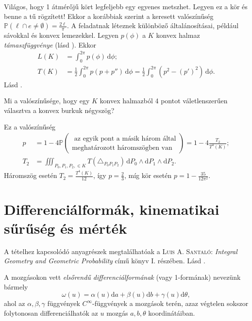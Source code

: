 \documentclass[DIV=15,appendixprefix]{scrreprt}
\theoremstyle{definition}
\theoremstyle{remark}
\newcommand{\prob}{\mathbb{P}}
\begin{document}
Világos, hogy 1 átmérőjű kört legfeljebb egy egyenes metszhet. Legyen ez a kör és benne a tű
rögzített! Ekkor a korábbiak szerint a keresett valószínűség $ \prob \left( \ell \cap e \neq
\emptyset\right) = \frac{ 2 \ell }{ \pi } $. A feladatnak léteznek különböző általánosításai,
például sávokkal és konvex lemezekkel.
%
Legyen $ p \left( \phi \right) $ a $ K $ konvex halmaz \emph{támaszfüggvénye} (lásd
\cite[1.~fejezet, 2.~szakasz, 3--4.~oldal]{Santalo}). Ekkor
\begin{align*}
	L \left( K \right) &= \int_{ 0 }^{ 2 \pi } p \left( \phi \right) \, \mathrm{ d } \phi;\\
	T \left( K \right) &= \frac{ 1 }{ 2 } \int_{ 0 }^{ 2 \pi } p \left( p + p'' \right) \,
	\mathrm{ d } \phi = \frac{ 1 }{ 2 } \int_{ 0 }^{ 2 \pi } \left( p^{ 2 } - \left( p'
		\right)^{ 2 } \right) \, \mathrm{ d } \phi.
\end{align*}
%
Lásd \cite[4.~fejezet, 5.~szakasz, 63--65.~oldal]{Santalo}.

Mi a valószínűsége, hogy egy $ K $ konvex halmazból 4 pontot váletlenszerűen választva a konvex
burkuk négyszög?

Ez a valószínűség
\begin{align*}
	p &= 1 - 4 \prob \left( \substack{\text{ az egyik pont a másik három által}\\\text{meghatározott
	háromszögben van}} \right) = 1 - 4 \frac{ T_{ 2 } }{ T^{ 4 } \left( K \right) };\\
	T_{ 2 } &= \iiint_{P_{ 0 },{} P_{ 1 },{} P_{ 2 },{} \in K } T \left( \triangle_{ P_{ 0 }
	P_{ 1 }P_{ 2 } } \right) \, \mathrm{ d } P_{ 0 } \wedge  \mathrm{ d } P_{ 1 } \wedge
	\mathrm{ d } P_{ 2 }.
\end{align*}
Háromszög esetén $ T_{ 2 } = \frac{ T^{ 4 } \left( K \right) }{ 12 } $, így $ p = \frac{ 2 }{ 3 } $,
míg kör esetén $ p = 1 - \frac{ 35 }{ 12 \pi^{ 2 } } $.
%
\section{Differenciálformák, kinematikai sűrűség és mérték}
%
A tételhez kapcsolódó anyagrészek megtalálhatóak a \textsc{Luis A. Santaló}: \emph{Integral Geometry
and Geometric Probability} \cite{Santalo} című könyv I. részében.
%
Lásd \cite[6.~fejezet, 2.~szakasz, 82--84.~oldal]{Santalo}.

A mozgásokon vett \emph{elsőrendű differenciálformának} (vagy 1-formának) nevezünk bármely
\begin{equation*}
	\omega \left( u \right) = \alpha \left( u \right) \mathrm{ d } a + \beta \left( u \right)
	\mathrm{ d } b + \gamma \left( u \right) \mathrm{ d } \theta,
\end{equation*}
ahol az $ \alpha,{} \beta,{} \gamma $ függvények $ C^{ \infty } $-függvények a mozgások terén, azaz
végtelen sokszor folytonosan differenciálhatók az $ u $ mozgás $ a,{} b,{} \theta $ koordinátáiban.
\end{document}
